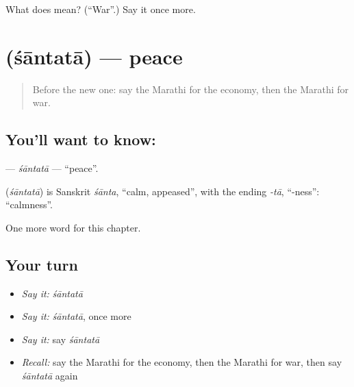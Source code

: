 \begin{tcolorbox}[breakable,colback=teal!4,colframe=teal!35!black,title={Before you move on}]
What does  mean? (\textquotedblleft{}War\textquotedblright{}.) Say it once more.
\end{tcolorbox}
\section[\texorpdfstring{\mr{शांतता} (śāntatā)}{शांतता (śāntatā)}]{ (śāntatā) — peace}

\label{lesson:MR-C209-santata}



\begin{quote}
Before the new one: say the Marathi for the economy, then the Marathi for war.
\end{quote}

\subsection*{You'll want to know: }
\textbf{} — \emph{śāntatā} — \textquotedblleft{}peace\textquotedblright{}.

\begin{cousinweb}
\textbf{} (\emph{śāntatā}) is Sanskrit \emph{śānta}, \textquotedblleft{}calm, appeased\textquotedblright{}, with the ending \emph{-tā}, \textquotedblleft{}-ness\textquotedblright{}: \textquotedblleft{}calmness\textquotedblright{}.
\end{cousinweb}

\begin{grammarlens}[title={What you've built}]
One more word for this chapter.
\end{grammarlens}

\subsection*{Your turn}
\begin{itemize}
\raggedright
  \item \emph{Say it:} \emph{śāntatā}
  \item \emph{Say it:} \emph{śāntatā}, once more
  \item \emph{Say it:} say \emph{śāntatā}
  \item \emph{Recall:} say the Marathi for the economy, then the Marathi for war, then say \emph{śāntatā} again
\end{itemize}

